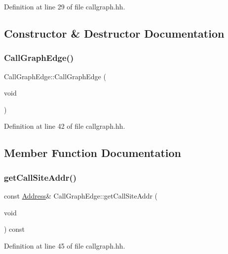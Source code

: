 Definition at line 29 of file callgraph.\+hh.



\subsection{Constructor \& Destructor Documentation}
\mbox{\label{class_call_graph_edge_aa8a22494ac517656afcf05e5e6a1598e}} 
\subsubsection{\texorpdfstring{CallGraphEdge()}{CallGraphEdge()}}
{\footnotesize\ttfamily Call\+Graph\+Edge\+::\+Call\+Graph\+Edge (\begin{DoxyParamCaption}\item[{void}]{ }\end{DoxyParamCaption})\hspace{0.3cm}{\ttfamily [inline]}}



Definition at line 42 of file callgraph.\+hh.



\subsection{Member Function Documentation}
\mbox{\label{class_call_graph_edge_a4f340cece8e49d9ec0a5907d8bed9936}} 
\subsubsection{\texorpdfstring{getCallSiteAddr()}{getCallSiteAddr()}}
{\footnotesize\ttfamily const \mbox{\hyperlink{class_address}{Address}}\& Call\+Graph\+Edge\+::get\+Call\+Site\+Addr (\begin{DoxyParamCaption}\item[{void}]{ }\end{DoxyParamCaption}) const\hspace{0.3cm}{\ttfamily [inline]}}



Definition at line 45 of file callgraph.\+hh.

